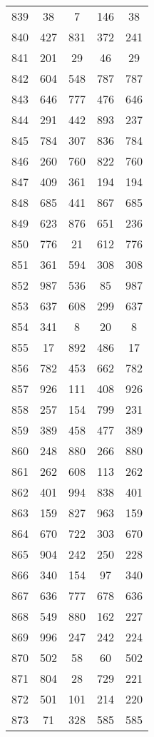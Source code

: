 \documentclass[a4paper,10pt,ngerman]{scrartcl}
\begin{document}
\begin{longtable}[c]{c|c|c|c|c}
    839 & 38 & 7 & 146 & 38 \\
    840 & 427 & 831 & 372 & 241 \\
    841 & 201 & 29 & 46 & 29 \\
    842 & 604 & 548 & 787 & 787 \\
    843 & 646 & 777 & 476 & 646 \\
    844 & 291 & 442 & 893 & 237 \\
    845 & 784 & 307 & 836 & 784 \\
    846 & 260 & 760 & 822 & 760 \\
    847 & 409 & 361 & 194 & 194 \\
    848 & 685 & 441 & 867 & 685 \\
    849 & 623 & 876 & 651 & 236 \\
    850 & 776 & 21 & 612 & 776 \\
    851 & 361 & 594 & 308 & 308 \\
    852 & 987 & 536 & 85 & 987 \\
    853 & 637 & 608 & 299 & 637 \\
    854 & 341 & 8 & 20 & 8 \\
    855 & 17 & 892 & 486 & 17 \\
    856 & 782 & 453 & 662 & 782 \\
    857 & 926 & 111 & 408 & 926 \\
    858 & 257 & 154 & 799 & 231 \\
    859 & 389 & 458 & 477 & 389 \\
    860 & 248 & 880 & 266 & 880 \\
    861 & 262 & 608 & 113 & 262 \\
    862 & 401 & 994 & 838 & 401 \\
    863 & 159 & 827 & 963 & 159 \\
    864 & 670 & 722 & 303 & 670 \\
    865 & 904 & 242 & 250 & 228 \\
    866 & 340 & 154 & 97 & 340 \\
    867 & 636 & 777 & 678 & 636 \\
    868 & 549 & 880 & 162 & 227 \\
    869 & 996 & 247 & 242 & 224 \\
    870 & 502 & 58 & 60 & 502 \\
    871 & 804 & 28 & 729 & 221 \\
    872 & 501 & 101 & 214 & 220 \\
    873 & 71 & 328 & 585 & 585 \\

\end{longtable}
\end{document}
